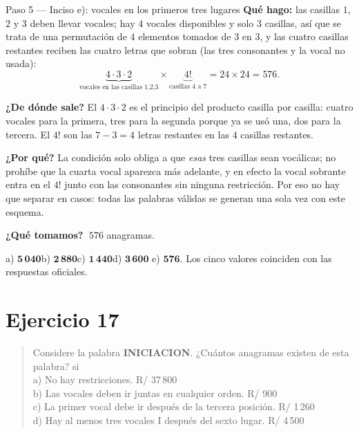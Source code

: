 \documentclass[11pt]{article}
\begin{document}
\begin{paso}{Paso 5 --- Inciso e): vocales en los primeros tres lugares}
\textbf{Qué hago:} las casillas $1$, $2$ y $3$ deben llevar vocales; hay $4$ vocales disponibles y solo
$3$ casillas, así que se trata de una permutación de $4$ elementos tomados de $3$ en $3$, y las cuatro
casillas restantes reciben las cuatro letras que sobran (las tres consonantes y la vocal no usada):
\[
\underbrace{4\cdot3\cdot2}_{\text{vocales en las casillas 1,2,3}}\times\underbrace{4!}_{\text{casillas 4 a 7}}
=24\times24=576 .
\]

\textbf{¿De dónde sale?} El $4\cdot3\cdot2$ es el principio del producto casilla por casilla: cuatro
vocales para la primera, tres para la segunda porque ya se usó una, dos para la tercera. El $4!$ son las
$7-3=4$ letras restantes en las $4$ casillas restantes.

\textbf{¿Por qué?} La condición solo obliga a que \emph{esas} tres casillas sean vocálicas; no prohíbe que
la cuarta vocal aparezca más adelante, y en efecto la vocal sobrante entra en el $4!$ junto con las
consonantes sin ninguna restricción. Por eso no hay que separar en casos: todas las palabras válidas se
generan una sola vez con este esquema.

\textbf{¿Qué tomamos?} $\;576$ anagramas.
\end{paso}

\begin{resp}
a) $\mathbf{5\,040}$\quad b) $\mathbf{2\,880}$\quad c) $\mathbf{1\,440}$\quad d) $\mathbf{3\,600}$\quad
e) $\mathbf{576}$. Los cinco valores coinciden con las respuestas oficiales.
\end{resp}

\section*{Ejercicio 17}

\begin{quote}
Considere la palabra \textbf{INICIACION}. ¿Cuántos anagramas existen de esta palabra? si\\
a) No hay restricciones. \hfill R/ 37\,800\\
b) Las vocales deben ir juntas en cualquier orden. \hfill R/ 900\\
c) La primer vocal debe ir después de la tercera posición. \hfill R/ 1\,260\\
d) Hay al menos tres vocales I después del sexto lugar. \hfill R/ 4\,500
\end{quote}
\end{document}
